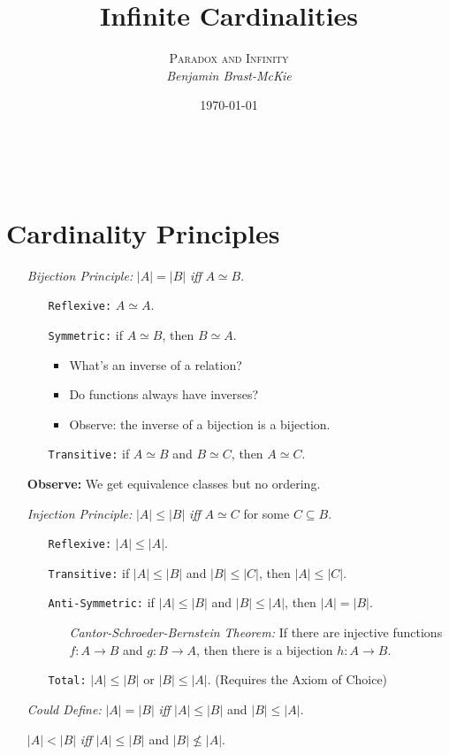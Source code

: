 \documentclass[a4paper, 11pt]{article} %
\title{\textbf{Infinite Cardinalities}} %
\author{\textsc{Paradox and Infinity}\\ \em Benjamin Brast-McKie} %
\date{\today} %
\makeatletter
\newcommand{\abs}[1]{|#1|} %
\renewcommand{\maketitle}{ %
\begin{flushright} %
{\LARGE\@title} %

\vspace{10pt} %

{\@author} %
\\\@date %

\vspace{-30pt} %
\end{flushright}
}
\makeatother
\begin{document}
\maketitle %

\thispagestyle{empty}



\section*{Cardinality Principles}

\begin{itemize}
  \item[\it Bijection Principle:] $\abs{A}=\abs{B}$ \textit{iff} $A\simeq B$. 
    \begin{itemize}
      \item[\tt Reflexive:] $A \simeq A$.
      \item[\tt Symmetric:] if $A \simeq B$, then $B \simeq A$.
      \begin{itemize}[leftmargin=-.5in]
        \item What's an inverse of a relation?
        \item Do functions always have inverses?
        \item Observe: the inverse of a bijection is a bijection.
      \end{itemize}
      \item[\tt Transitive:] if $A \simeq B$ and $B \simeq C$, then $A \simeq C$.
    \end{itemize}
  \item[\bf Observe:] We get equivalence classes but no ordering.
  \item[\it Injection Principle:] $\abs{A} \leq \abs{B}$ \textit{iff} $A \simeq C$ for some $C\subseteq B$. 
    \begin{itemize}
      \item[\tt Reflexive:] $|A| \leq |A|$.
      \item[\tt Transitive:] if $|A| \leq |B|$ and $|B| \leq |C|$, then $|A| \leq |C|$.
      \item[\tt Anti-Symmetric:] if $|A| \leq |B|$ and $|B| \leq |A|$, then $|A| = |B|$.
        \begin{itemize}[leftmargin=.5in]
          \item[\it Cantor-Schroeder-Bernstein Theorem:] If there are injective functions $f: A \to B$ and $g: B \to A$, then there is a bijection $h: A \to B$. 
        \end{itemize}
      \item[\tt Total:] $|A| \leq |B|$ or $|B| \leq |A|$. (Requires the Axiom of Choice)
    \end{itemize}
  \item[\it Could Define:] $\abs{A} = \abs{B}$ \textit{iff} $\abs{A} \leq \abs{B}$ and $\abs{B} \leq \abs{A}$.
  \item[] $\abs{A} < \abs{B}$ \textit{iff} $\abs{A} \leq \abs{B}$ and $\abs{B} \nleq \abs{A}$.
\end{itemize}
\end{document}
